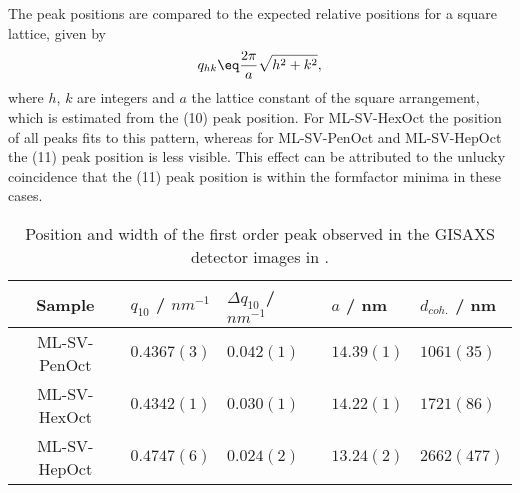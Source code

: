 \documentclass[\main/dresen_thesis.tex]{subfiles}
\begin{document}
    The peak positions are compared to the expected relative positions for a square lattice, given by
    \begin{align}
      q_{hk} \eq \frac{2 \pi}{a} \sqrt{h^2 + k^2},
    \end{align}
    where $h$, $k$ are integers and $a$ the lattice constant of the square arrangement, which is estimated from the (10) peak position.
    For ML-SV-HexOct the position of all peaks fits to this pattern, whereas for ML-SV-PenOct and ML-SV-HepOct the (11) peak position is less visible.
    This effect can be attributed to the unlucky coincidence that the (11) peak position is within the formfactor minima in these cases.
    \FloatBarrier

    \begin{table}[tb]
      \centering
      \caption{\label{tab:monolayers:solventProperties:GisaxsLatticeParams}Position and width of the first order peak observed in the GISAXS detector images in .}
      \begin{tabular}{ c || l | l || l | l }
        Sample  & $q_{10}$ / $\unit{nm^{-1}}$ & $\Delta q_{10}$ / $nm^{-1}$ & $a$ / nm & $d_{coh.}$ / nm \\
        \hline
        ML-SV-PenOct
          & $0.4367(3)$
          & $0.042(1)$
          & $14.39(1)$
          & $1061(35)$\\
        ML-SV-HexOct
          & $0.4342(1)$
          & $0.030(1)$
          & $14.22(1)$
          & $1721(86)$\\
        ML-SV-HepOct
          & $0.4747(6)$
          & $0.024(2)$
          & $13.24(2)$
          & $2662(477)$\\
        \hline
      \end{tabular}
    \end{table}
\end{document}
